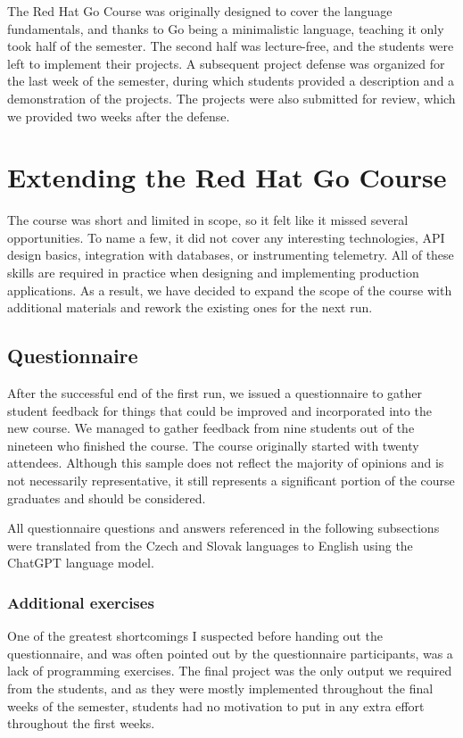 \documentclass[
  digital,
  color,
  oneside,
  nosansbold,
  nocolorbold,
  nolof,
  nolot,
]{fithesis4}
\begin{document}
The Red Hat Go Course was originally designed to cover the language fundamentals, and thanks to Go being a minimalistic language, teaching it only took half of the semester. The second half was lecture-free, and the students were left to implement their projects. A subsequent project defense was organized for the last week of the semester, during which students provided a description and a demonstration of the projects. The projects were also submitted for review, which we provided two weeks after the defense.

\section{Extending the Red Hat Go Course}

The course was short and limited in scope, so it felt like it missed several opportunities. To name a few, it did not cover any interesting technologies, API design basics, integration with databases, or instrumenting telemetry. All of these skills are required in practice when designing and implementing production applications. As a result, we have decided to expand the scope of the course with additional materials and rework the existing ones for the next run.

\subsection{Questionnaire}

After the successful end of the first run, we issued a questionnaire to gather student feedback for things that could be improved and incorporated into the new course. We managed to gather feedback from nine students out of the nineteen who finished the course. The course originally started with twenty attendees. Although this sample does not reflect the majority of opinions and is not necessarily representative, it still represents a significant portion of the course graduates and should be considered.

All questionnaire questions and answers referenced in the following subsections were translated from the Czech and Slovak languages to English using the ChatGPT\cite{chatgpt} language model.

\subsubsection{Additional exercises}\label{additional-exercises}

One of the greatest shortcomings I suspected before handing out the questionnaire, and was often pointed out by the questionnaire participants, was a lack of programming exercises. The final project was the only output we required from the students, and as they were mostly implemented throughout the final weeks of the semester, students had no motivation to put in any extra effort throughout the first weeks.
\end{document}
